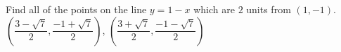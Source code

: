 {Find all of the points on the line $y=1-x$ which are $2$ units from $(1,-1)$.}
{$\left(\dfrac{3 - \sqrt{7}}{2}, \dfrac{-1 + \sqrt{7}}{2} \right)$, $\left(\dfrac{3 + \sqrt{7}}{2}, \dfrac{-1 - \sqrt{7}}{2} \right)$}